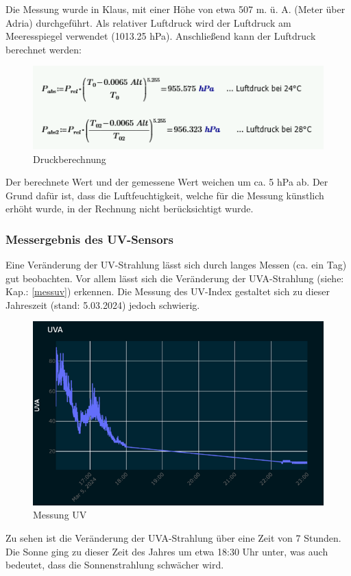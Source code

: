 \newpage
Die Messung wurde in Klaus, mit einer Höhe von etwa 507 m. ü. A. (Meter über Adria) durchgeführt. Als relativer Luftdruck wird der Luftdruck am Meeresspiegel verwendet (1013.25 hPa). Anschließend kann der Luftdruck berechnet werden:\\
\vspace{3mm}
\begin{figure}[H]
	\centering
	\includegraphics[scale=1.2]{image/berechnung.png}
	\caption{Druckberechnung}
	\label{fig:enter-label}
\end{figure}
\vspace{3mm}
Der berechnete Wert und der gemessene Wert weichen um ca. 5 hPa ab. Der Grund dafür ist, dass die Luftfeuchtigkeit, welche für die Messung künstlich erhöht wurde, in der Rechnung nicht berücksichtigt wurde.

\subsubsection{Messergebnis des UV-Sensors}
Eine Veränderung der UV-Strahlung lässt sich durch langes Messen (ca. ein Tag) gut beobachten. Vor allem lässt sich die Veränderung der UVA-Strahlung (siehe: Kap.: \ref{messuv}) erkennen. Die Messung des UV-Index gestaltet sich zu dieser Jahreszeit (stand: 5.03.2024) jedoch schwierig.\\
\vspace{3mm}
\begin{figure}[H]
	\centering
	\includegraphics[scale=1]{image/uvamessung.png}
	\caption{Messung UV}
	\label{fig:enter-label}
\end{figure}
\vspace{3mm}
Zu sehen ist die Veränderung der UVA-Strahlung über eine Zeit von 7 Stunden. Die Sonne ging zu dieser Zeit des Jahres um etwa 18:30 Uhr unter, was auch bedeutet, dass die Sonnenstrahlung schwächer wird. 

